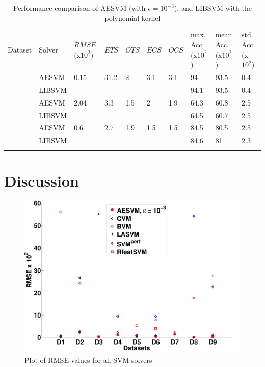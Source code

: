 \documentclass[twoside]{article}
\begin{document}
\begin{table}[h!]
\begin{center}
\begin{tabular}{|@{}p{1.2cm}!{\vrule width 1pt}@{}p{1.6cm}@{}!{\vrule width 1pt}@{}p{1.2cm}|@{}l|@{}l|@{}l|@{}l|@{}p{1.87cm}|@{}p{1.8cm}|@{}p{1.6cm}|} \hline
Dataset & Solver & $RMSE$ (x$10^2$) & $ETS$ & $OTS$ & $ECS$ & $OCS$ & max. Acc. (x$10^2$)& mean Acc. (x$10^2$)& std. Acc. (x$10^2$)\\ 
 &  AESVM & 0.15 & 31.2 & 2 & 3.1 & 3.1 & 94 & 93.5 & 0.4 \\ 
& LIBSVM &  &  &  &  &  & 94.1 & 93.5 & 0.4 \\ 
 &  AESVM & 2.04 & 3.3 & 1.5 & 2 & 1.9 & 64.3 & 60.8 & 2.5 \\ 
& LIBSVM &  &  &  &  &  & 64.5 & 60.7 & 2.5 \\ 
 &  AESVM & 0.6 & 2.7 & 1.9 & 1.5 & 1.5 & 84.5 & 80.5 & 2.5 \\ 
& LIBSVM &  &  &  &  &  & 84.6 & 81 & 2.3 \\ 
\end{tabular}
\end{center}
\caption{Performance comparison of AESVM (with $\epsilon = 10^{-3}$), and LIBSVM with the polynomial kernel}
\label{tb:testing8}
\end{table}

\section{Discussion} \label{sec:Disc}

\begin{figure}[h!]
\centering
\includegraphics[scale = 0.44]{summaryRMSE}
\caption{Plot of RMSE values for all SVM solvers}\label{fig:resSummary1}
\end{figure}
\end{document}
